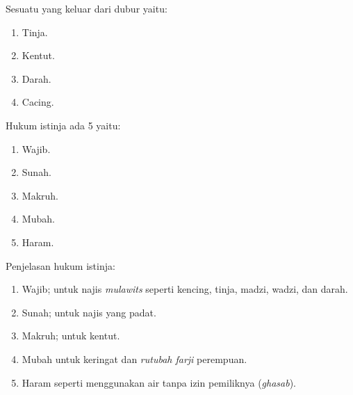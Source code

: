Sesuatu yang keluar dari dubur yaitu: 
\begin{enumerate}
    \item Tinja.
    \item Kentut. 
    \item Darah. 
    \item Cacing.
\end{enumerate}

Hukum istinja ada 5 yaitu:
\begin{enumerate}
    \item Wajib.
    \item Sunah.
    \item Makruh.
    \item Mubah.
    \item Haram.
\end{enumerate}

Penjelasan hukum istinja:
\begin{enumerate}
    \item Wajib; untuk najis \textit{mulawits} seperti kencing, tinja, madzi, wadzi, dan darah.
    \item Sunah; untuk najis yang padat.
    \item Makruh; untuk kentut.
    \item Mubah untuk keringat dan \textit{rutubah farji} perempuan.
    \item Haram seperti menggunakan air tanpa izin pemiliknya (\textit{ghasab}).
\end{enumerate}